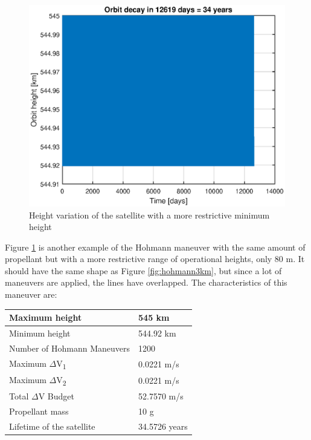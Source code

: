 \begin{figure}[h]
\centerline{\includegraphics[scale=1]{ThrustersDrag/thrust80m.eps}}
\caption{Height variation of the satellite with a more restrictive minimum height}
\label{fig:hohmann80m}
\end{figure}

Figure \ref{fig:hohmann80m} is another example of the Hohmann maneuver with the same amount of propellant but with a more restrictive range of operational heights, only 80 m. It should have the same shape as Figure \ref{fig:hohmann3km}, but since a lot of maneuvers are applied, the lines have overlapped. The characteristics of this maneuver are:

\begin{center}
\begin{tabular}{ | l | l | }
\hline
Maximum height & 545 km \\
\hline
Minimum height & 544.92 km \\
\hline
Number of Hohmann Maneuvers & 1200 \\
\hline
Maximum $\Delta$V\textsubscript{1} & 0.0221 m/s \\
\hline
Maximum $\Delta$V\textsubscript{2} & 0.0221 m/s \\
\hline
Total $\Delta$V Budget & 52.7570 m/s \\ 
\hline 
Propellant mass & 10 g \\
\hline
Lifetime of the satellite & 34.5726 years \\
\hline
\end{tabular}
\end{center}

